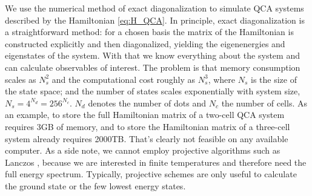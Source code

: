 We use the numerical method of exact diagonalization \cite{Fehske} to simulate
QCA systems described by the Hamiltonian \eqref{eq:H_QCA}. In principle, exact
diagonalization is a straightforward method: for a chosen basis the matrix of
the Hamiltonian is constructed explicitly and then diagonalized, yielding the
eigenenergies and eigenstates of the system. With that we know everything about
the system and can calculate observables of interest. The problem is that memory
consumption scales as $N_s^2$ and the computational cost roughly as $N_s^3$,
where $N_s$ is the size of the state space; and the number of states scales
exponentially with system size, $N_s = 4^{N_d} = 256^{N_c}$. $N_d$ denotes the
number of dots and $N_c$ the number of cells. As an example, to store the full
Hamiltonian matrix of a two-cell QCA system requires 3GB of memory, and to store
the Hamiltonian matrix of a three-cell system already requires 2000TB. That's
clearly not feasible on any available computer. As a side note, we cannot employ
projective algorithms such as Lanczos \cite{Fehske}, because we are interested
in finite temperatures and therefore need the full energy spectrum. Typically,
projective schemes are only useful to calculate the ground state or the few
lowest energy states. 

